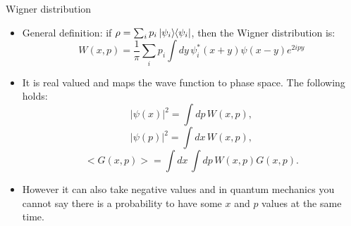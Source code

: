 \documentclass{beamer}
\begin{document}


\begin{frame}{Wigner distribution}
	\begin{itemize}
		\vfill
		\item General definition: if $\rho = \sum_i p_i \ket{\psi_i}\mkern-4mu\bra{\psi_i}$, then the Wigner distribution is:
		$$ W(x,p) = \frac{1}{\pi} \sum_i p_i \int dy\,\psi^*_i(x+y) \psi(x-y) e^{2ipy} $$
		\vfill
		\item It is real valued and maps the wave function to phase space. The following holds:
		$$ |\psi(x)|^2 = \int dp\, W(x,p),$$
		$$ |\psi(p)|^2 = \int dx\, W(x,p),$$
		$$ <G(x,p)> = \int dx\, \int dp\, W(x,p)G(x,p).$$
		\vfill
		\item However it can also take negative values and in quantum mechanics you cannot say there is a probability to have some $x$ and $p$ values at the same time.
		\vfill
	\end{itemize}
\end{frame}
\end{document}
